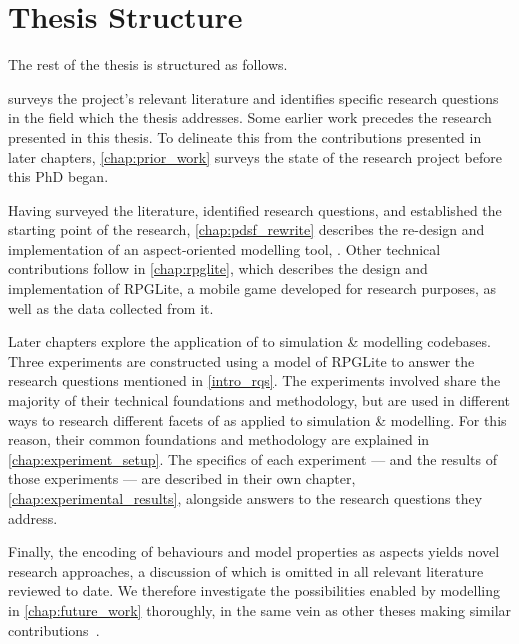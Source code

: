 \section{Thesis Structure}
\label{intro_thesis_structure}

The rest of the thesis is structured as follows.

 surveys the project's relevant literature and identifies
specific research questions in the field which the thesis addresses. Some
earlier work precedes the research presented in this thesis. To delineate this
from the contributions presented in later chapters, \cref{chap:prior_work}
surveys the state of the research project before this PhD began.

Having surveyed the literature, identified research questions, and established
the starting point of the research, \cref{chap:pdsf_rewrite} describes the
re-design and implementation of an aspect-oriented modelling tool, \pdsf{}.
Other technical contributions follow in \cref{chap:rpglite}, which describes the
design and implementation of RPGLite, a mobile game developed for research
purposes, as well as the data collected from it.

Later chapters explore the application of \aop{} to simulation \& modelling
codebases. Three experiments are constructed using a model of RPGLite to answer
the research questions mentioned in \cref{intro_rqs}. The experiments involved
share the majority of their technical foundations and methodology, but are used
in different ways to research different facets of \aop{} as applied to
simulation \& modelling. For this reason, their common foundations and
methodology are explained in \cref{chap:experiment_setup}. The specifics of each
experiment --- and the results of those experiments --- are described in their
own chapter, \cref{chap:experimental_results}, alongside answers to the research
questions they address.

Finally, the encoding of behaviours and model properties as aspects yields novel
research approaches, a discussion of which is omitted in all relevant literature
reviewed to date. We therefore investigate the possibilities enabled by
\aspectoriented{} modelling in \cref{chap:future_work} thoroughly, in the same
vein as other theses making similar contributions~\cite{marsh1994formalising}.








